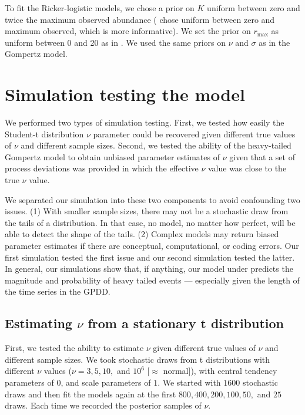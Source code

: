 To fit the Ricker-logistic models, we chose a prior on $K$ uniform between zero and twice the maximum observed abundance (\citet{clark2010} chose uniform between zero and maximum observed, which is more informative). We set the prior on $r_\mathrm{max}$ as uniform between 0 and 20 as in \citet{clark2010}. We used the same priors on $\nu$ and $\sigma$ as in the Gompertz model.

\section{Simulation testing the model}

We performed two types of simulation testing. First, we tested how easily the Student-t distribution $\nu$ parameter could be recovered given different true values of $\nu$ and different sample sizes. Second, we tested the ability of the heavy-tailed Gompertz model to obtain unbiased parameter estimates of $\nu$ given that a set of process deviations was provided in which the effective $\nu$ value was close to the true $\nu$ value.

We separated our simulation into these two components to avoid confounding two issues. (1) With smaller sample sizes, there may not be a stochastic draw from the tails of a distribution. In that case, no model, no matter how perfect, will be able to detect the shape of the tails. (2) Complex models may return biased parameter estimates if there are conceptual, computational, or coding errors. Our first simulation tested the first issue and our second simulation tested the latter. In general, our simulations show that, if anything, our model under predicts the magnitude and probability of heavy tailed events --- especially given the length of the time series in the GPDD.

\subsection{Estimating $\nu$ from a stationary t distribution}

First, we tested the ability to estimate $\nu$ given different true values of $\nu$ and different sample sizes. We took stochastic draws from t distributions with different $\nu$ values ($\nu = 3, 5, 10,$ and $10^6$ [$\approx$ normal]), with central tendency parameters of $0$, and scale parameters of $1$. We started with $1600$ stochastic draws and then fit the models again at the first $800, 400, 200, 100, 50,$ and $25$ draws. Each time we recorded the posterior samples of $\nu$.

